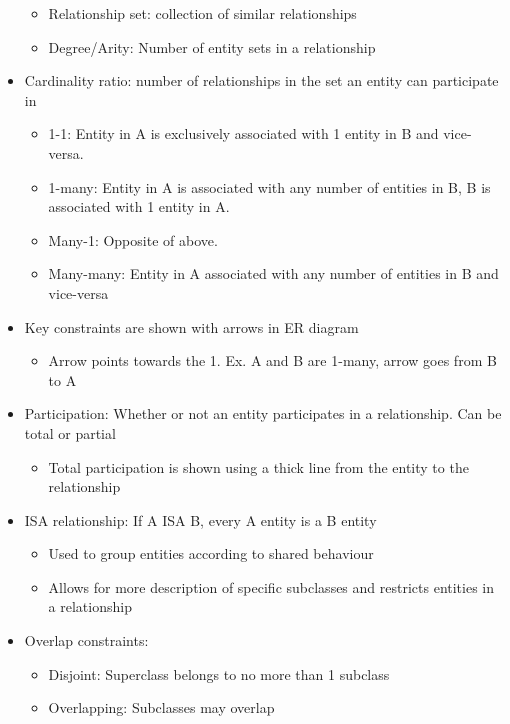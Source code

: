 \documentclass[8pt,landscape,a4paper, fleqn, dvipsnames]{extarticle}
\begin{document}
\begin{multicols*}{4}
\begin{itemize}
\begin{itemize}
        \item Relationship set: collection of similar relationships
        \item Degree/Arity: Number of entity sets in a relationship 
    \end{itemize}
    \item Cardinality ratio: number of relationships in the set an entity can participate in
    \begin{itemize}
        \item 1-1: Entity in A is exclusively associated with 1 entity in B and vice-versa.
        \item 1-many: Entity in A is associated with any number of entities in B, B is associated with 1 entity in A.
        \item Many-1: Opposite of above.
        \item Many-many: Entity in A associated with any number of entities in B and vice-versa
    \end{itemize}
    \item Key constraints are shown with arrows in ER diagram
    \begin{itemize}
        \item Arrow points towards the 1. Ex. A and B are 1-many, arrow goes from B to A
    \end{itemize}
    \item Participation: Whether or not an entity participates in a relationship. Can be total or partial
    \begin{itemize}
        \item Total participation is shown using a thick line from the entity to the relationship
    \end{itemize}
    \item ISA relationship: If A ISA B, every A entity is a B entity
    \begin{itemize}
        \item Used to group entities according to shared behaviour
        \item Allows for more description of specific subclasses and restricts entities in a relationship
    \end{itemize}
    \item Overlap constraints:
    \begin{itemize}
        \item Disjoint: Superclass belongs to no more than 1 subclass
        \item Overlapping: Subclasses may overlap
    \end{itemize}

\end{itemize}
\end{multicols*}
\end{document}

